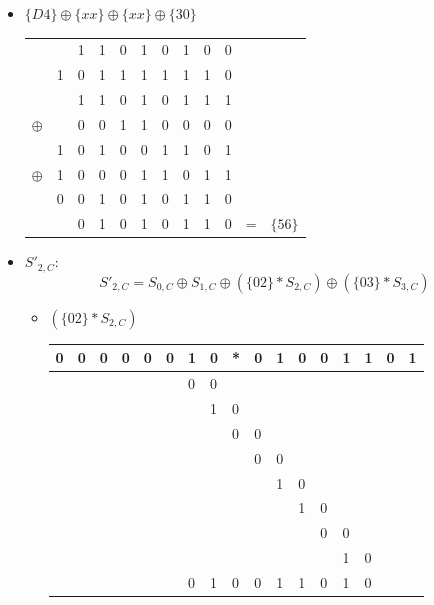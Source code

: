 \begin{itemize}
        \item $\{D4\} \oplus \{xx\} \oplus \{xx\} \oplus \{30\}$
        \begin{center}
\begin{tabular}{llllllllllll}
 &  & 1 & 1 & 0 & 1 & 0 & 1 & 0 & 0 &  & \\
 & 1 & 0 & 1 & 1 & 1 & 1 & 1 & 1 & 0 &  & \\
 &  & 1 & 1 & 0 & 1 & 0 & 1 & 1 & 1 &  & \\
$\oplus$ &  & 0 & 0 & 1 & 1 & 0 & 0 & 0 & 0 &  & \\
\hline
 & 1 & 0 & 1 & 0 & 0 & 1 & 1 & 0 & 1 &  &\\
 $\oplus$ & 1 & 0 & 0 & 0 & 1 & 1 & 0 & 1 & 1 &  &\\
 \hline
 & 0 & 0 & 1 & 0 & 1 & 0 & 1 & 1 & 0 &  &\\
 &  & 0 & 1 & 0 & 1 & 0 & 1 & 1 & 0 & = & $\{56\}$
        \end{tabular}
        \end{center}

     \item $S'_{2,C}$:
     \begin{equation}
         S'_{2,C} = S_{0,C} \oplus S_{1,C} \oplus (\{02\} * S_{2,C}) \oplus (\{03\} * S_{3,C})
     \end{equation}

     \begin{itemize}
        \item $(\{02\} * S_{2,C})$
\begin{center}
\begin{tabular}{lllllllllllllllll}
0 & 0 & 0 & 0 & 0 & 0 & 1 & 0 & * & 0 & 1 & 0 & 0 & 1 & 1 & 0 & 1\\
\hline
 &  &  &  &  &  & 0 & 0 &  &  &  &  &  &  &  &  & \\
 &  &  &  &  &  &  & 1 & 0 &  &  &  &  &  &  &  & \\
 &  &  &  &  &  &  &  & 0 & 0 &  &  &  &  &  &  & \\
 &  &  &  &  &  &  &  &  & 0 & 0 &  &  &  &  &  & \\
 &  &  &  &  &  &  &  &  &  & 1 & 0 &  &  &  &  & \\
 &  &  &  &  &  &  &  &  &  &  & 1 & 0 &  &  &  & \\
 &  &  &  &  &  &  &  &  &  &  &  & 0 & 0 &  &  & \\
 &  &  &  &  &  &  &  &  &  &  &  &  & 1 & 0 &  & \\
 \hline
 &  &  &  &  &  & 0 & 1 & 0 & 0 & 1 & 1 & 0 & 1 & 0 &  & \\
         \end{tabular}
         \end{center}


\end{itemize}
\end{itemize}
